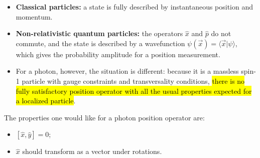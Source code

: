 \begin{itemize}
    \item \textbf{Classical particles:} a state is fully described by instantaneous position and momentum.
    \item \textbf{Non-relativistic quantum particles:} the operators $\hat{x}$ and $\hat{p}$ do not commute, and the state is described by a wavefunction $\psi(\vec{x})=\langle \vec{x}|\psi\rangle$, which gives the probability amplitude for a position measurement.
    \item For a photon, however, the situation is different: because it is a massless spin-1 particle with gauge constraints and transversality conditions, \hl{there is no fully satisfactory position operator with all the usual properties expected for a localized particle}.
\end{itemize}
    The properties one would like for a photon position operator are:
\begin{itemize}
    \item $[\hat{x},\hat{y}]=0$;
    \item $\hat{x}$ should transform as a vector under rotations.
\end{itemize}

